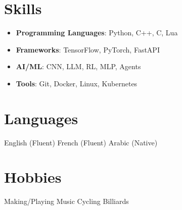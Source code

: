 \documentclass[a4paper,11pt]{article}%
\begin{document}
\section*{Skills}%
\begin{itemize}[leftmargin=*]%
\item \textbf{Programming Languages}: Python, C++, C, Lua%
\item \textbf{Frameworks}: TensorFlow, PyTorch, FastAPI%
\item \textbf{AI/ML}: CNN, LLM, RL, MLP, Agents%
\item \textbf{Tools}: Git, Docker, Linux, Kubernetes%
\end{itemize}%
\section*{Languages}%
English (Fluent)%
\newline%
%
French (Fluent)%
\newline%
%
Arabic (Native)%
\newline%
%
\section*{Hobbies}%
Making/Playing Music%
\newline%
%
Cycling%
\newline%
%
Billiards%
\newline%
%
\end{document}
